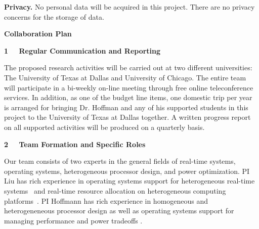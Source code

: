\documentclass[10pt,letterpaper]{article}
\begin{document}
\vspace{1mm}
\noindent \textbf{Privacy.} No personal data will be acquired in this project. There are no privacy concerns for the storage of data.


\newpage
\begin{center}
\Large\textbf{Collaboration Plan}
\end{center} \normalsize

\vspace{6mm}
\large \noindent\textbf{1 \ \ Regular Communication and Reporting}\normalsize
\vspace{4mm}

\noindent The proposed research activities will be carried out at two different universities: The University of Texas at Dallas and University of Chicago. The entire team will participate in a bi-weekly on-line meeting through free online teleconference services. In addition, as one of the budget line items, one domestic trip per year is arranged for bringing Dr. Hoffman and any of his supported students in this project to the University of Texas at Dallas together. A written progress report on all supported activities will be produced on a quarterly basis.

\vspace{6mm}
\large \noindent\textbf{2 \ \ Team Formation and Specific Roles}\normalsize
\vspace{4mm}

\noindent Our team consists of two experts in the general fields of real-time systems, operating systems, heterogeneous processor design, and power optimization. PI Liu has rich experience in operating systems support for heterogeneous real-time systems~\cite{Liu12, GPES, zhou2015supporting, Zhou2014a} and real-time resource allocation on heterogeneous computing platforms~\cite{Tong14a, LiuRTSS14a, LiuRTSS15, Liu1, Liu2, Liu6, Liu7, Liu10, liu2014supporting, LiuRTSS14b, elliott1minimizing, Liu3, Liu4, Liu5, Liu9, Liu11, Liu13}.
PI Hoffmann has rich experience in homogeneous\cite{raw1,raw2,raw3,tilera1,tilera2} and heterogeneneous \cite{ASAP,HPEC,ASAP2,ISSoC} processor design as well as operating systems support for managing performance and power tradeoffs \cite{LEO,POET,DynamicKnobs,JouleGuard,PTRADE,PCP,TCST,HotPower,kim-cpsna}.
\end{document}
